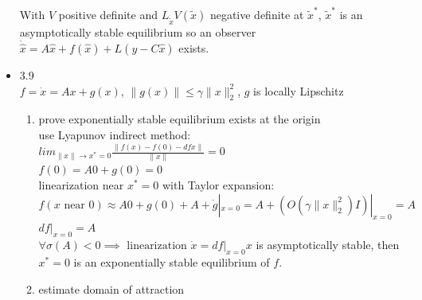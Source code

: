 \documentclass[12pt,letter]{article}
\begin{document}
\begin{itemize}
  With $V$ positive definite and $L_{\dot{\tilde{x}}}V(\tilde{x})$ negative definite at $\tilde{x}^*$, $\tilde{x}^*$ is an asymptotically stable equilibrium so an observer $\dot{\hat{x}}=A\hat{x}+f(\hat{x})+L(y-C\hat{x})$ exists.

  \pagebreak
  
\item 3.9\\
  $f=\dot{x}=Ax+g(x)$, $\|g(x)\| \leq \gamma \|x\|_2^2$, $g$ is locally Lipschitz\\
  \begin{enumerate}
    \item prove exponentially stable equilibrium exists at the origin\\
      
      use Lyapunov indirect method:\\
      $lim_{\|x\| \to x^*=0} \frac{\|f(x)-f(0)-dfx\|}{\|x\|}=0$\\
      $f(0)=A0+g(0)=0$\\
      linearization near $x^*=0$ with Taylor expansion:\\
      $f(x \text{ near 0}) \approx A0 + g(0) + A + \dot{g}|_{x=0}=A+(O(\gamma \|x\|_2^2)I)|_{x=0} = A$\\
      $df|_{x=0}=A$\\
      $\forall \sigma(A) < 0 \implies \text{ linearization }\dot{x} = df|_{x=0} x$ is asymptotically stable, then $x^*=0$ is an exponentially stable equilibrium of $f$.\\

    \item estimate domain of attraction\\


\end{enumerate}
\end{itemize}
\end{document}
